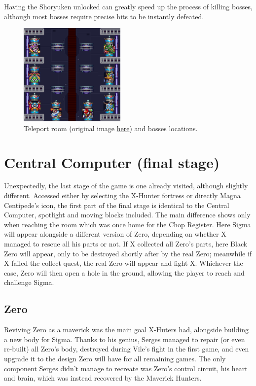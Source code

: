 Having the Shoryuken unlocked can greatly speed up the process of killing bosses, although most bosses require precise hits to be instantly defeated.
\begin{figure}[htp]
	\centering
	\includegraphics[height=5cm]{figures/X2/Hunter_stages/map-4.png}
	\caption[Teleport room and boss location]{Teleport room (original image \href{https://vgmaps.com/Atlas/SuperNES/MegaManX2-X-HunterBase-Stage4.png}{here}) and bosses locations.}
	\label{fig:teleport_room}
\end{figure}

\section{Central Computer (final stage)}

Unexpectedly, the last stage of the game is one already visited, although slightly different. Accessed either by selecting the X-Hunter fortress or directly Magna Centipede's icon, the first part of the final stage is identical to the Central Computer, spotlight and moving blocks included. The main difference shows only when reaching the room which was once home for the \hyperlink{miniboss:Chop_Register}{Chop Register}. Here Sigma will appear alongside a different version of Zero, depending on whether X managed to rescue all his parts or not. If X collected all Zero's parts, here Black Zero will appear, only to be destroyed shortly after by the real Zero; meanwhile if X failed the collect quest, the real Zero will appear and fight X. Whichever the case, Zero will then open a hole in the ground, allowing the player to reach and challenge Sigma. 

\subsection{Zero}\label{boss:Zero_X2}
Reviving Zero as a maverick was the main goal X-Huters had, alongside building a new body for Sigma. Thanks to his genius, Serges managed to repair (or even re-built) all Zero's body, destroyed during Vile's fight in the first game, and even upgrade it to the design Zero will have for all remaining games. The only component Serges didn't manage to recreate was Zero's control circuit, his heart and brain, which was instead recovered by the Maverick Hunters.

